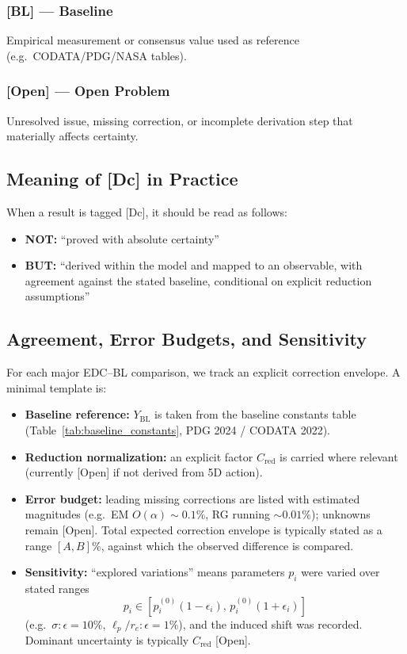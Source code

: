 \subsubsection*{[BL] --- Baseline}
Empirical measurement or consensus value used as reference (e.g.\ CODATA/PDG/NASA tables).

\subsubsection*{[Open] --- Open Problem}
Unresolved issue, missing correction, or incomplete derivation step that materially affects certainty.

\subsection*{Meaning of [Dc] in Practice}

When a result is tagged [Dc], it should be read as follows:

\begin{itemize}
\item \textbf{NOT:} ``proved with absolute certainty''
\item \textbf{BUT:} ``derived within the model and mapped to an observable, with agreement
against the stated baseline, conditional on explicit reduction assumptions''
\end{itemize}

\subsection*{Agreement, Error Budgets, and Sensitivity}

For each major EDC--BL comparison, we track an explicit correction envelope.
A minimal template is:

\begin{itemize}
\item \textbf{Baseline reference:} $Y_{\mathrm{BL}}$ is taken from the baseline constants table 
(Table~\ref{tab:baseline_constants}, PDG 2024 / CODATA 2022).

\item \textbf{Reduction normalization:} an explicit factor $C_{\mathrm{red}}$ is carried where 
relevant (currently [Open] if not derived from 5D action).

\item \textbf{Error budget:} leading missing corrections are listed with estimated magnitudes 
(e.g.\ EM $O(\alpha) \sim 0.1\%$, RG running $\sim 0.01\%$); unknowns remain [Open]. 
Total expected correction envelope is typically stated as a range $[A, B]\%$, against which 
the observed difference is compared.

\item \textbf{Sensitivity:} ``explored variations'' means parameters $p_i$ were varied over 
stated ranges
\[
p_i \in [p_i^{(0)}(1-\epsilon_i),\, p_i^{(0)}(1+\epsilon_i)]
\]
(e.g.\ $\sigma: \epsilon = 10\%$, $\ell_p/r_e: \epsilon = 1\%$), and the induced shift 
was recorded. Dominant uncertainty is typically $C_{\mathrm{red}}$ [Open].
\end{itemize}

